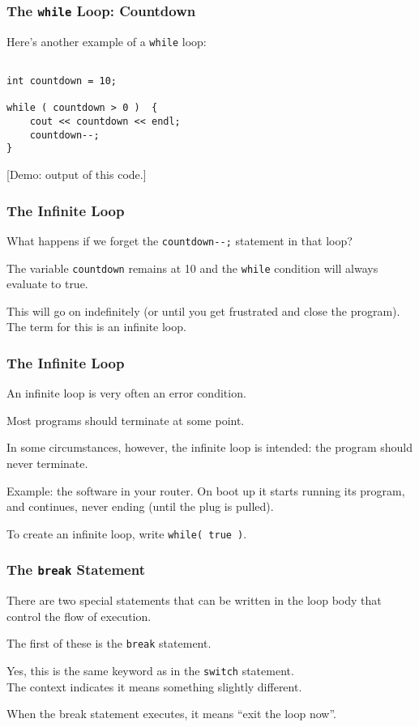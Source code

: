 \begin{frame}[fragile]
\frametitle{The \texttt{while} Loop: Countdown}

Here's another example of a \texttt{while} loop:

\begin{verbatim}

int countdown = 10;

while ( countdown > 0 )  {
    cout << countdown << endl;
    countdown--;
}

\end{verbatim}

[Demo: output of this code.]

\end{frame}

\begin{frame}
\frametitle{The Infinite Loop}

What happens if we forget the \texttt{countdown{-}{-};} statement in that loop?

The variable \texttt{countdown} remains at 10 and the \texttt{while} condition will always evaluate to true.

This will go on indefinitely (or until you get frustrated and close the program). The term for this is an \alert{infinite loop}.

\end{frame}

\begin{frame}
\frametitle{The Infinite Loop}

An infinite loop is very often an error condition.

Most programs should terminate at some point.

In some circumstances, however, the infinite loop is intended: the program should never terminate.

Example: the software in your router. On boot up it starts running its program, and continues, never ending (until the plug is pulled).

To create an infinite loop, write \texttt{while( true )}.

\end{frame}

\begin{frame}
\frametitle{The \texttt{break} Statement}

There are two special statements that can be written in the loop body that control the flow of execution.

The first of these is the \texttt{break} statement.

Yes, this is the same keyword as in the \texttt{switch} statement.\\
\quad The context indicates it means something slightly different.

When the break statement executes, it means ``exit the loop now''.

\end{frame}


